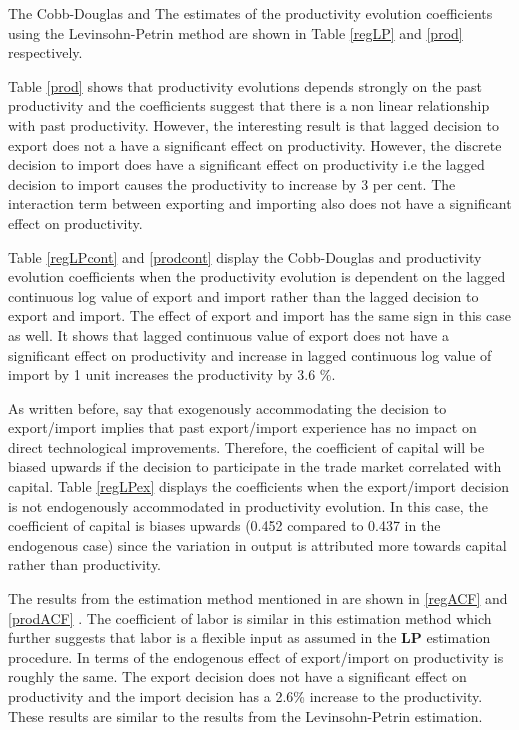 \documentclass[12pt]{article}
\begin{document}
The Cobb-Douglas and The estimates of the productivity evolution
coefficients  using the Levinsohn-Petrin
method are shown in Table \ref{regLP} and \ref{prod}  respectively. 

 
Table \ref{prod} shows that productivity evolutions depends strongly
on the past productivity and the coefficients suggest that there is a
non linear relationship with past
productivity. However, the interesting result is that lagged decision to export does not a have
a significant effect on productivity. However, the
discrete decision to import does have a significant effect on productivity i.e the
lagged decision to import causes the productivity to increase by 3 per
cent. The interaction term between exporting and importing also does
not have a significant effect on productivity. 


Table \ref{regLPcont} and \ref{prodcont} display the Cobb-Douglas and
productivity evolution
coefficients  when the
productivity evolution is dependent on the lagged continuous log value of export
and import rather than the lagged decision to export and import.
The effect of export and import has the same sign in this case as
well. It  shows that lagged
continuous value of export does not have a significant effect on
productivity and  increase in lagged continuous log value of import  by 1 unit
increases the productivity by 3.6 \%.  



As written before, \textcite{de2013detecting} say that exogenously accommodating the
decision to export/import implies that
past export/import experience has no impact on direct technological
improvements. Therefore, the coefficient of capital will be biased
upwards if the decision to participate in the trade market correlated with capital. Table
\ref{regLPex} displays the coefficients when the export/import
decision is not endogenously accommodated in 
productivity evolution. In this case, the coefficient of capital is
biases upwards (0.452 compared to 0.437 in the endogenous case)  since
the variation in output is attributed more towards capital rather than productivity.   




The results from the estimation method mentioned in
\textcite{ackerberg2006structural} are shown in \ref{regACF} and \ref{prodACF}
. The coefficient of labor is similar in this
estimation method which further suggests that labor is a flexible
input as assumed in the \textbf{LP} estimation procedure.   In terms of the endogenous effect
of export/import on productivity is roughly the same. The export
decision does not have a significant effect on productivity and the
import decision has a 2.6\% increase to the productivity. These
results are similar to the results from the Levinsohn-Petrin
estimation.   
\end{document}
